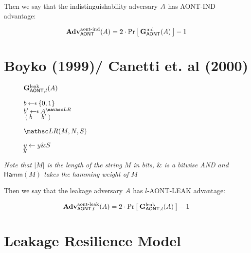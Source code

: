 \documentclass[11pt,twoside]{article}
\begin{document}
Then we say that the indistinguishability adversary $A$ has AONT-IND advantage: 

$$\textbf{Adv}^\text{aont-ind}_\mathsf{AONT}(A)=2\cdot{\Pr\left[\,{\mathbf{G}_{\mathsf{AONT}}^\text{ind}(A)}\,\right]} - 1$$

\section{Boyko (1999)/ Canetti et. al (2000)}

\begin{figure}[H]
{
\underline{$\mathbf{G}_{\mathsf{AONT},l}^\text{leak}(A)$}

\begin{algorithm}[H]
$b \getsr \bits$\\
$b' \getsr \advA^{\LRO}$\\
\Return $(b=b')$
\end{algorithm}

\smallskip
\underline{$\LRO(M,N,S)$}

\begin{algorithm}[H]
$y\gets y\mathrel{\&} S$\\
\Return $y$
\end{algorithm}
}
\end{figure}

\emph{Note that $|M|$ is the length of the string $M$ in bits, $\mathrel{\&}$ is a bitwise AND and $\mathsf{Hamm}(M)$ takes the hamming weight of $M$}

Then we say that the leakage adversary $A$ has $l$-AONT-LEAK advantage: 

$$\textbf{Adv}^\text{aont-leak}_{\mathsf{AONT},l}(A)=2\cdot{\Pr\left[\,{\mathbf{G}_{\mathsf{AONT},l}^\text{leak}(A)}\,\right]} - 1$$

\section{Leakage Resilience Model} 
\end{document}
